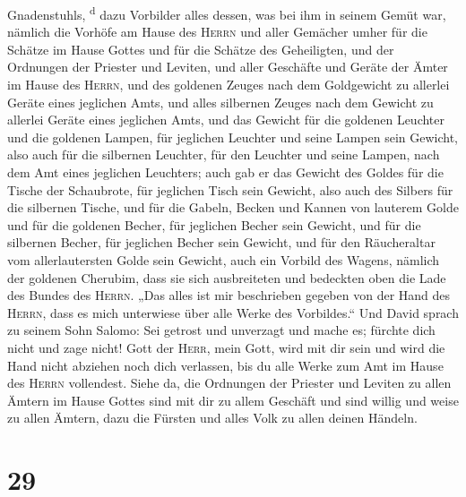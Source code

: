 Gnadenstuhls, \textsuperscript{d}  dazu Vorbilder alles
dessen, was bei ihm in seinem Gemüt war, nämlich die Vorhöfe am Hause
des \textsc{Herrn} und aller Gemächer umher für die Schätze im Hause
Gottes und für die Schätze des Geheiligten,  und der
Ordnungen der Priester und Leviten, und aller Geschäfte und Geräte der
Ämter im Hause des \textsc{Herrn},  und des goldenen
Zeuges nach dem Goldgewicht zu allerlei Geräte eines jeglichen Amts, und
alles silbernen Zeuges nach dem Gewicht zu allerlei Geräte eines
jeglichen Amts,  und das Gewicht für die goldenen
Leuchter und die goldenen Lampen, für jeglichen Leuchter und seine
Lampen sein Gewicht, also auch für die silbernen Leuchter, für den
Leuchter und seine Lampen, nach dem Amt eines jeglichen Leuchters;
 auch gab er das Gewicht des Goldes für die Tische der
Schaubrote, für jeglichen Tisch sein Gewicht, also auch des Silbers für
die silbernen Tische,  und für die Gabeln, Becken und
Kannen von lauterem Golde und für die goldenen Becher, für jeglichen
Becher sein Gewicht, und für die silbernen Becher, für jeglichen Becher
sein Gewicht,  und für den Räucheraltar vom
allerlautersten Golde sein Gewicht, auch ein Vorbild des Wagens, nämlich
der goldenen Cherubim, dass sie sich ausbreiteten und bedeckten oben die
Lade des Bundes des \textsc{Herrn}.  „Das alles ist mir
beschrieben gegeben von der Hand des \textsc{Herrn}, dass es mich
unterwiese über alle Werke des Vorbildes.``  Und David
sprach zu seinem Sohn Salomo: Sei getrost und unverzagt und mache es;
fürchte dich nicht und zage nicht! Gott der \textsc{Herr}, mein Gott,
wird mit dir sein und wird die Hand nicht abziehen noch dich verlassen,
bis du alle Werke zum Amt im Hause des \textsc{Herrn} vollendest.
 Siehe da, die Ordnungen der Priester und Leviten zu
allen Ämtern im Hause Gottes sind mit dir zu allem Geschäft und sind
willig und weise zu allen Ämtern, dazu die Fürsten und alles Volk zu
allen deinen Händeln.

\hypertarget{section-28}{%
\section{29}\label{section-28}}


